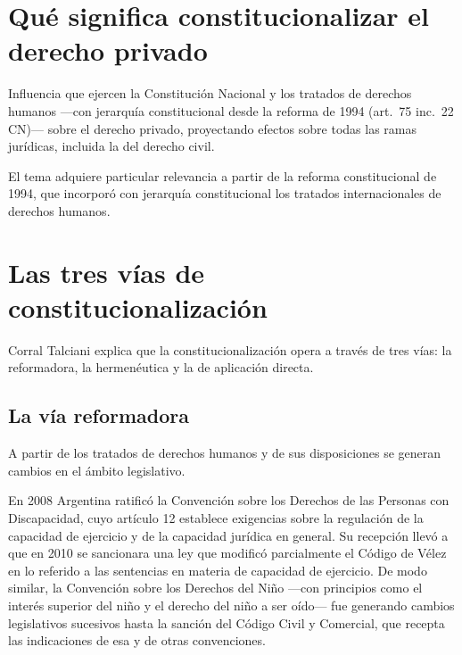 \documentclass[12pt,oneside]{book}
\begin{document}
\section{Qué significa constitucionalizar el derecho privado}

\begin{definicion}
Influencia que ejercen la Constitución Nacional y los tratados de derechos humanos ---con jerarquía constitucional desde la reforma de 1994 (art.~75 inc.~22 CN)--- sobre el derecho privado, proyectando efectos sobre todas las ramas jurídicas, incluida la del derecho civil.
\end{definicion}

El tema adquiere particular relevancia a partir de la reforma constitucional de 1994, que incorporó con jerarquía constitucional los tratados internacionales de derechos humanos.

\section{Las tres vías de constitucionalización}

Corral Talciani explica que la constitucionalización opera a través de tres vías: la reformadora, la hermenéutica y la de aplicación directa.

\subsection{La vía reformadora}

A partir de los tratados de derechos humanos y de sus disposiciones se generan cambios en el ámbito legislativo.

\begin{ejemplo}
En 2008 Argentina ratificó la Convención sobre los Derechos de las Personas con Discapacidad, cuyo artículo 12 establece exigencias sobre la regulación de la capacidad de ejercicio y de la capacidad jurídica en general. Su recepción llevó a que en 2010 se sancionara una ley que modificó parcialmente el Código de Vélez en lo referido a las sentencias en materia de capacidad de ejercicio. De modo similar, la Convención sobre los Derechos del Niño ---con principios como el interés superior del niño y el derecho del niño a ser oído--- fue generando cambios legislativos sucesivos hasta la sanción del Código Civil y Comercial, que recepta las indicaciones de esa y de otras convenciones.
\end{ejemplo}
\end{document}
